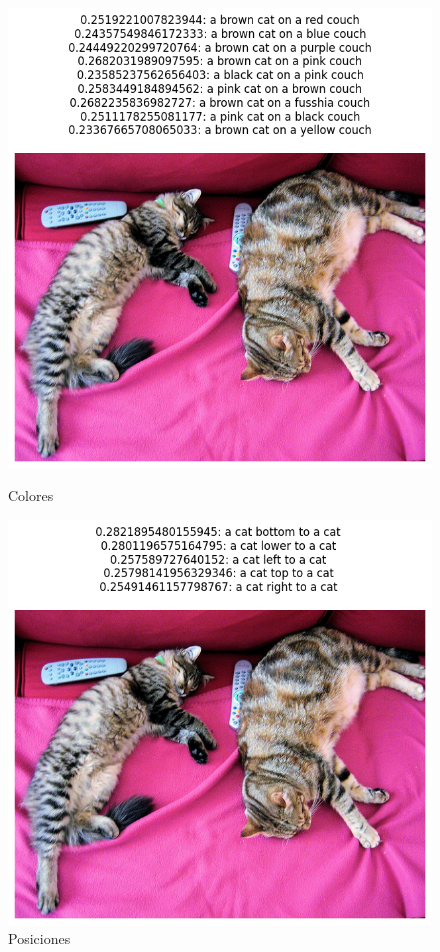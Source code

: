 \begin{figure}[H]
\centering
\begin{minipage}{0.45\textwidth}
 \includegraphics[width=\textwidth]{Graphics/clip_color.png}
 \caption{Colores}
 \label{fig:color}
\end{minipage}%
\begin{minipage}{0.45\textwidth}
 \includegraphics[width=\textwidth]{Graphics/clip_pos.png}
 \caption{Posiciones}
 \label{fig:region}
\end{minipage}
\end{figure}


